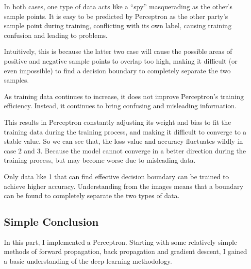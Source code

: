 In both cases, one type of data acts like a ``spy'' masquerading as the other's sample points.
It is easy to be predicted by Perceptron as the other party's sample point during training,
conflicting with its own label,
causing training confusion and leading to problems.

Intuitively, this is because the latter two case will cause the possible areas of positive and negative sample points to overlap too high,
making it difficult (or even impossible) to find a decision boundary to completely separate the two samples.

As training data continues to increase, it does not improve Perceptron's training efficiency.
Instead, it continues to bring confusing and misleading information.

This results in Perceptron constantly adjusting its weight and bias to fit the training data during the training process, and making it difficult to converge to a stable value.
So we can see that, the loss value and accuracy fluctuates wildly in case 2 and 3.
Because the model cannot converge in a better direction during the training process, but may become worse due to misleading data.

Only data like 1 that can find effective decision boundary can be trained to achieve higher accuracy.
Understanding from the images means that a boundary can be found to completely separate the two types of data.

\subsection{Simple Conclusion}

In this part, I implemented a Perceptron.
Starting with some relatively simple methods of forward propagation, back propagation and gradient descent, I gained a basic understanding of the deep learning methodology.
